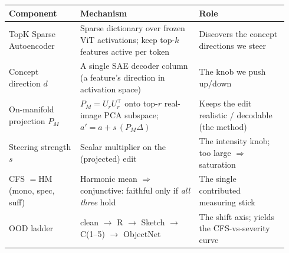\documentclass[11pt]{article}
\begin{document}
\renewcommand{\arraystretch}{1.2}
\begin{center}\small
\begin{tabular}{@{}p{0.24\linewidth} p{0.40\linewidth} p{0.30\linewidth}@{}}
\toprule
\textbf{Component} & \textbf{Mechanism} & \textbf{Role}\\
\midrule
TopK Sparse Autoencoder & Sparse dictionary over frozen ViT activations; keep top-$k$
  features active per token & Discovers the concept directions we steer\\
Concept direction $d$ & A single SAE decoder column (a feature's direction in
  activation space) & The knob we push up/down\\
On-manifold projection $P_M$ & $P_M=U_rU_r^{\!\top}$ onto top-$r$ real-image PCA
  subspace; $a'=a+s\,(P_M\Delta)$ & Keeps the edit realistic / decodable (the method)\\
Steering strength $s$ & Scalar multiplier on the (projected) edit & The intensity knob;
  too large $\Rightarrow$ saturation\\
CFS $=\mathrm{HM}$(mono, spec, suff) & Harmonic mean $\Rightarrow$ conjunctive: faithful
  only if \emph{all three} hold & The single contributed measuring stick\\
OOD ladder & clean $\to$ R $\to$ Sketch $\to$ C(1--5) $\to$ ObjectNet & The shift axis;
  yields the CFS-vs-severity curve\\
\bottomrule
\end{tabular}
\end{center}
\end{document}
